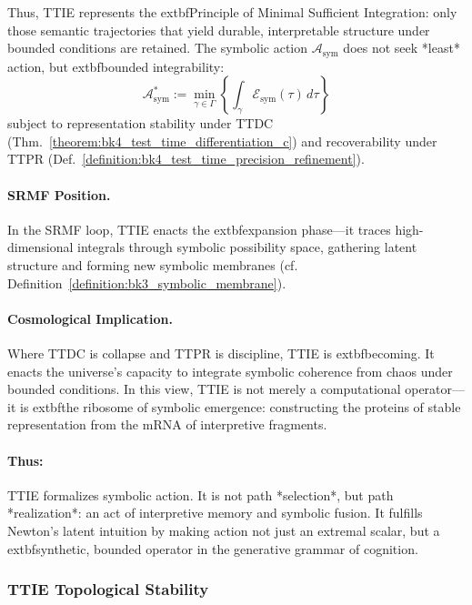 \begin{scholium}
Thus, TTIE represents the 	extbf{Principle of Minimal Sufficient Integration}: only those semantic trajectories that yield durable, interpretable structure under bounded conditions are retained. The symbolic action $\mathcal{A}_{\text{sym}}$ does not seek *least* action, but 	extbf{bounded integrability}:
\[
\mathcal{A}_{\text{sym}}^\ast := \min_{\gamma \in \Gamma}
\left\{ \int_\gamma \mathcal{E}_{\text{sym}}(\tau)\,d\tau \right\}
\]
subject to representation stability under TTDC
(Thm.~\ref{theorem:bk4_test_time_differentiation_c}) and recoverability under
TTPR (Def.~\ref{definition:bk4_test_time_precision_refinement}).

\paragraph{SRMF Position.} In the SRMF loop, TTIE enacts the 	extbf{expansion phase}---it traces high-dimensional integrals through symbolic possibility space, gathering latent structure and forming new symbolic membranes (cf. Definition~\ref{definition:bk3_symbolic_membrane}).

\paragraph{Cosmological Implication.} Where TTDC is collapse and TTPR is discipline, TTIE is 	extbf{becoming}. It enacts the universe's capacity to integrate symbolic coherence from chaos under bounded conditions. In this view, TTIE is not merely a computational operator---it is 	extbf{the ribosome of symbolic emergence}: constructing the proteins of stable representation from the mRNA of interpretive fragments.

\paragraph{Thus:} TTIE formalizes symbolic action. It is not path *selection*, but path *realization*: an act of interpretive memory and symbolic fusion. It fulfills Newton's latent intuition by making action not just an extremal scalar, but a 	extbf{synthetic, bounded operator} in the generative grammar of cognition.

\end{scholium}


\subsubsection{TTIE Topological Stability}
\label{subsec:bk4_ttie_topological_stability}

